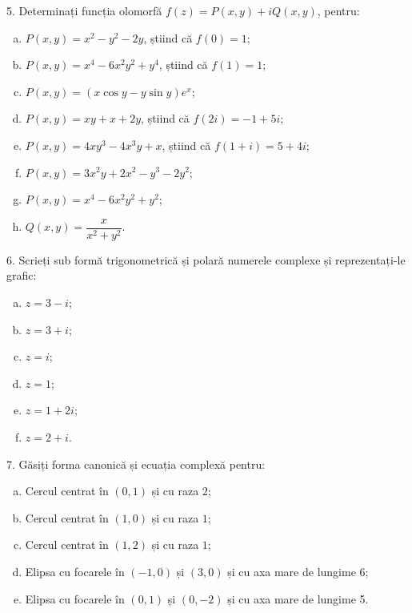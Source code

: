 \vspace{0.3cm}

5. Determinați funcția olomorfă $ f(z) = P(x, y) + iQ(x, y) $, pentru:
\begin{enumerate}[(a)]
  \item $ P(x, y) = x^2 - y^2 - 2y $, știind că $ f(0) = 1 $;
  \item $ P(x, y) = x^4 - 6x^2y^2 + y^4 $, știind că $ f(1) = 1 $;
  \item $ P(x, y) = (x \cos y - y \sin y)e^x $;
  \item $ P(x, y) = xy + x + 2y $, știind că $ f(2i) = -1 + 5i $;
  \item $ P(x, y) = 4xy^3 - 4x^3y + x $, știind că $ f(1 + i) = 5 + 4i $;
  \item $ P(x, y) = 3x^2y + 2x^2 - y^3 - 2y^2 $;
  \item $ P(x, y) = x^4 - 6x^2y^2 + y^2 $;
  \item $ Q(x, y) = \dfrac{x}{x^2 + y^2} $.
\end{enumerate}

\vspace{0.3cm}

6. Scrieți sub formă trigonometrică și polară numerele complexe și
reprezentați-le grafic:
\begin{enumerate}[(a)]
\item $ z = 3 - i $;
\item $ z = 3 + i $;
\item $ z = i $;
\item $ z = 1 $;
\item $ z = 1 + 2i $;
\item $ z = 2 + i $.
\end{enumerate}

\vspace{0.3cm}

7. Găsiți forma canonică și ecuația complexă pentru:
\begin{enumerate}[(a)]
\item Cercul centrat în $ (0, 1) $ și cu raza $ 2 $;
\item Cercul centrat în $ (1, 0) $ și cu raza $ 1 $;
\item Cercul centrat în $ (1, 2) $ și cu raza $ 1 $;
\item Elipsa cu focarele în $ (-1, 0) $ și $ (3, 0) $ și cu
  axa mare de lungime 6;
\item Elipsa cu focarele în $ (0, 1) $ și $ (0, -2) $ și
  cu axa mare de lungime 5.
\end{enumerate}

